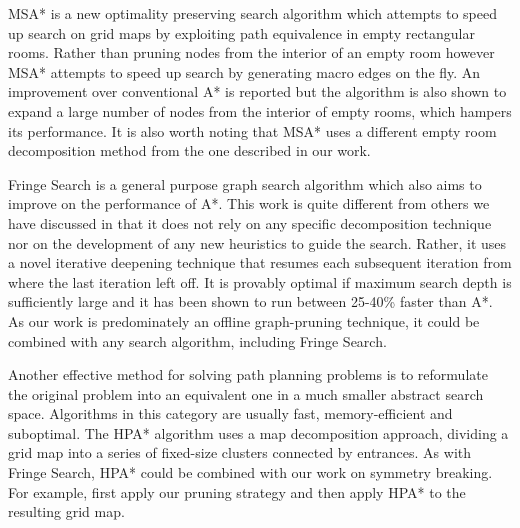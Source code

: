 \par
MSA* \cite{bolanca09} is a new optimality preserving search algorithm which attempts to speed up search 
on grid maps by exploiting path equivalence in empty rectangular rooms. 
Rather than pruning nodes from the interior of an empty room however MSA* attempts to speed up 
search by generating macro edges on the fly.
An improvement over conventional A* is reported but the algorithm is also
shown to expand a large number of nodes from the interior of empty rooms, which hampers its performance.
It is also worth noting that MSA* uses a different empty room decomposition method
from the one described in our work.
\par
Fringe Search \cite{bjornsson05} is a general purpose graph search algorithm which also
aims to improve on the performance of A*.
This work is quite different from others we have discussed in that it does not
rely on any specific decomposition technique nor on the development of any new heuristics
to guide the search.
Rather, it uses a novel iterative deepening technique that resumes each subsequent iteration from where the last
iteration left off. 
It is provably optimal if maximum search depth is sufficiently large and 
it has been shown to run between 25-40\% faster than A*.
As our work is predominately an offline graph-pruning technique, it could be combined with any search algorithm, including
Fringe Search.
\par
Another effective method for solving path planning problems is to reformulate the original problem
into an equivalent one in a much smaller abstract search space.
Algorithms in this category are usually fast, memory-efficient and suboptimal.
The HPA* algorithm \cite{botea04} uses a map decomposition approach,
dividing a grid map into a series of fixed-size clusters connected 
by entrances.
As with Fringe Search, HPA* could be combined with our work on symmetry breaking.
For example, first apply our pruning strategy and then apply HPA* to the resulting grid map.
